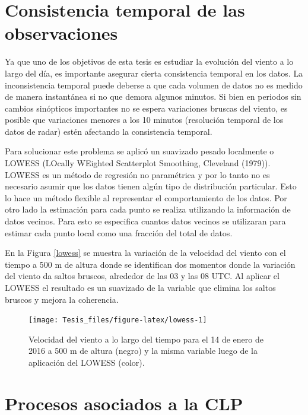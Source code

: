 \documentclass[12pt,spanish,oneside, a4paper]{book}
\begin{document}
\section{Consistencia temporal de las
observaciones}\label{consistencia-temporal-de-las-observaciones}

Ya que uno de los objetivos de esta tesis es estudiar la evolución del
viento a lo largo del día, es importante asegurar cierta consistencia
temporal en los datos. La inconsistencia temporal puede deberse a que
cada volumen de datos no es medido de manera instantánea si no que
demora algunos minutos. Si bien en periodos sin cambios sinópticos
importantes no se espera variaciones bruscas del viento, es posible que
variaciones menores a los 10 minutos (resolución temporal de los datos
de radar) estén afectando la consistencia temporal.

Para solucionar este problema se aplicó un suavizado pesado localmente o
LOWESS (LOcally WEighted Scatterplot Smoothing, Cleveland (1979)).
LOWESS es un método de regresión no paramétrica y por lo tanto no es
necesario asumir que los datos tienen algún tipo de distribución
particular. Esto lo hace un método flexible al representar el
comportamiento de los datos. Por otro lado la estimación para cada punto
se realiza utilizando la información de datos vecinos. Para esto se
especifica cuantos datos vecinos se utilizaran para estimar cada punto
local como una fracción del total de datos.

En la Figura \ref{lowess} se muestra la variación de la velocidad del
viento con el tiempo a 500 m de altura donde se identifican dos momentos
donde la variación del viento da saltos bruscos, alrededor de las 03 y
las 08 UTC. Al aplicar el LOWESS el resultado es un suavizado de la
variable que elimina los saltos bruscos y mejora la coherencia.

\begin{figure}

{\centering \texttt{[image: Tesis\_files/figure-latex/lowess-1]} 

}

\caption{Velocidad del viento a lo largo del tiempo para el 14 de enero de 2016 a 500 m de altura (negro) y la misma variable luego de la aplicación del LOWESS (color). \label{lowess}}\label{fig:lowess}
\end{figure}

\section{Procesos asociados a la CLP}\label{procesos-asociados-a-la-clp}
\end{document}
